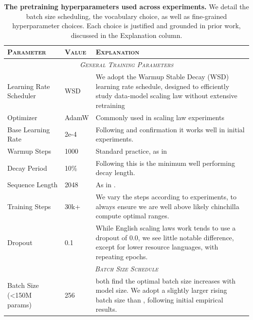 \begingroup
\setlength{\tabcolsep}{4pt}

\begin{table}[ht]
    \centering
    \small
    \caption{
    \textbf{The pretraining hyperparameters used across experiments.} We detail the batch size scheduling, the vocabulary choice, as well as fine-grained hyperparameter choices. Each choice is justified and grounded in prior work, discussed in the Explanation column.}
    \begin{tabular}{l | l | p{8cm}} %
        \toprule
        \textsc{Parameter} & \textsc{Value} & \textsc{Explanation} \\
        \midrule
        \multicolumn{3}{c}{\textsc{\emph{General Training Parameters}}} \\
        \midrule
        Learning Rate Scheduler & WSD & We adopt the Warmup Stable Decay (WSD) learning rate schedule, designed to efficiently study data-model scaling law without extensive retraining \citep{hu2024minicpm,hagele2024scaling} \\
        Optimizer & AdamW & Commonly used in scaling law experiments \citep{loshchilov2018decoupled, hoffmann2022training} \\
        Base Learning Rate & 2e-4 & Following \citep{muennighoff2024scaling} and confirmation it works well in initial experiments. \\ %
        Warmup Steps & 1000 & Standard practice, as in \citep{longpre2023pretrainer} \\ %
        Decay Period & 10\% & Following \citep{hu2024minicpm,hagele2024scaling} this is the minimum well performing decay length. \\
        Sequence Length & 2048 & As in \citep{longpre2023pretrainer,muennighoff2024scaling}. \\
        Training Steps & 30k+ & We vary the steps according to experiments, to always ensure we are well above likely chinchilla compute optimal ranges. \\
        Dropout & 0.1 & While English scaling laws work tends to use a dropout of 0.0, we see little notable difference, except for lower resource languages, with repeating epochs.  \\
        \midrule
        \multicolumn{3}{c}{\textsc{\emph{Batch Size Schedule}}} \\
        \midrule
        Batch Size (<150M params) & 256 & \multirow{4}{8cm}{\citet{hu2024minicpm,muennighoff2024scaling} both find the optimal batch size increases with model size. We adopt a slightly larger rising batch size than \citet{muennighoff2024scaling}, following initial empirical results.} \\ %

\end{tabular}
\end{table}
